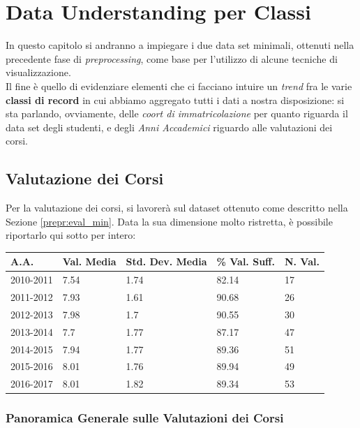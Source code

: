 \chapter{Data Understanding per Classi}
\label{ch:visual}

In questo capitolo si andranno a impiegare i due data set minimali, ottenuti nella precedente fase di \textit{preprocessing}, come base per l'utilizzo di alcune tecniche di visualizzazione. \\

Il fine è quello di evidenziare elementi che ci facciano intuire un \textit{trend} fra le varie \textbf{classi di record} in cui abbiamo aggregato tutti i dati a nostra disposizione: si sta parlando, ovviamente, delle \textit{coort di immatricolazione} per quanto riguarda il data set degli studenti, e degli \textit{Anni Accademici} riguardo alle valutazioni dei corsi.

\section{Valutazione dei Corsi}

Per la valutazione dei corsi, si lavorerà sul dataset ottenuto come descritto nella Sezione \ref{prepr:eval_min}. Data la sua dimensione molto ristretta, è possibile riportarlo qui sotto per intero:

\begin{table}[]
\begin{tabular}{lllll}
\hline
A.A. & Val. Media & Std. Dev. Media & \% Val. Suff. & N. Val. \\ \hline
2010-2011 & 7.54 & 1.74 & 82.14 & 17 \\
2011-2012 & 7.93 & 1.61 & 90.68 & 26 \\
2012-2013 & 7.98 & 1.7 & 90.55 & 30 \\
2013-2014 & 7.7 & 1.77 & 87.17 & 47 \\
2014-2015 & 7.94 & 1.77 & 89.36 & 51 \\
2015-2016 & 8.01 & 1.76 & 89.94 & 49 \\
2016-2017 & 8.01 & 1.82 & 89.34 & 53 \\ \hline
\end{tabular}
\end{table}

    \subsection{Panoramica Generale sulle Valutazioni dei Corsi}
    \label{visual:eval_gen}

